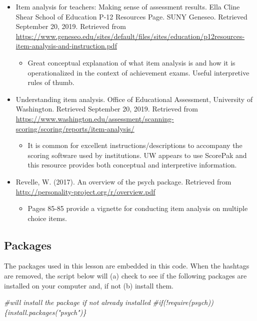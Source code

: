 \documentclass[
  english,
]{book}
\newenvironment{Shaded}{\begin{snugshade}}{\end{snugshade}}
\newcommand{\CommentTok}[1]{\textcolor[rgb]{0.56,0.35,0.01}{\textit{#1}}}
\providecommand{\tightlist}{%
  \setlength{\itemsep}{0pt}\setlength{\parskip}{0pt}}
\begin{document}
\begin{itemize}
\tightlist
\item
  Item analysis for teachers: Making sense of assessment results. Ella Cline Shear School of Education P-12 Resources Page. SUNY Geneseo. Retrieved September 20, 2019. Retrieved from \url{https://www.geneseo.edu/sites/default/files/sites/education/p12resources-item-analysis-and-instruction.pdf}

  \begin{itemize}
  \tightlist
  \item
    Great conceptual explanation of what item analysis is and how it is operationalized in the context of achievement exams. Useful interpretive rules of thumb.
  \end{itemize}
\item
  Understanding item analysis. Office of Educational Assessment, University of Washington. Retrieved September 20, 2019. Retrieved from \url{https://www.washington.edu/assessment/scanning-scoring/scoring/reports/item-analysis/}

  \begin{itemize}
  \tightlist
  \item
    It is common for excellent instructions/descriptions to accompany the scoring software used by institutions. UW appears to use ScorePak and this resource provides both conceptual and interpretive information.
  \end{itemize}
\item
  Revelle, W. (2017). An overview of the psych package. Retrieved from \url{http://personality-project.org/r/overview.pdf}

  \begin{itemize}
  \tightlist
  \item
    Pages 85-85 provide a vignette for conducting item analysis on multiple choice items.
  \end{itemize}
\end{itemize}

\hypertarget{packages-4}{%
\subsection{Packages}\label{packages-4}}

The packages used in this lesson are embedded in this code. When the hashtags are removed, the script below will (a) check to see if the following packages are installed on your computer and, if not (b) install them.

\begin{Shaded}
\begin{Highlighting}[]
\CommentTok{\#will install the package if not already installed}
\CommentTok{\#if(!require(psych))\{install.packages("psych")\}}
\end{Highlighting}
\end{Shaded}
\end{document}
